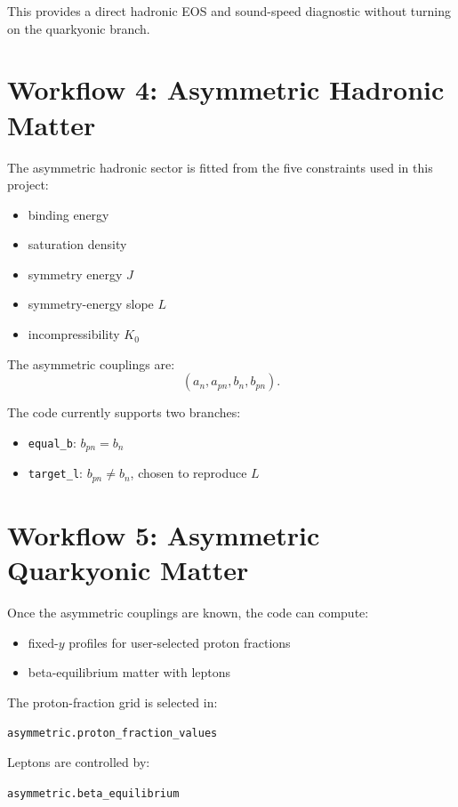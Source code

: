 \documentclass[11pt]{article}
\begin{document}
This provides a direct hadronic EOS and sound-speed diagnostic without turning
on the quarkyonic branch.

\section{Workflow 4: Asymmetric Hadronic Matter}

The asymmetric hadronic sector is fitted from the five constraints used in this
project:

\begin{itemize}
\item binding energy
\item saturation density
\item symmetry energy $J$
\item symmetry-energy slope $L$
\item incompressibility $K_0$
\end{itemize}

The asymmetric couplings are:
\begin{equation}
(a_n, a_{pn}, b_n, b_{pn}).
\end{equation}

The code currently supports two branches:

\begin{itemize}
\item \texttt{equal\_b}: $b_{pn} = b_n$
\item \texttt{target\_l}: $b_{pn} \neq b_n$, chosen to reproduce $L$
\end{itemize}

\section{Workflow 5: Asymmetric Quarkyonic Matter}

Once the asymmetric couplings are known, the code can compute:

\begin{itemize}
\item fixed-$y$ profiles for user-selected proton fractions
\item beta-equilibrium matter with leptons
\end{itemize}

The proton-fraction grid is selected in:
\begin{center}
\texttt{asymmetric.proton\_fraction\_values}
\end{center}

Leptons are controlled by:
\begin{center}
\texttt{asymmetric.beta\_equilibrium}
\end{center}
\end{document}
